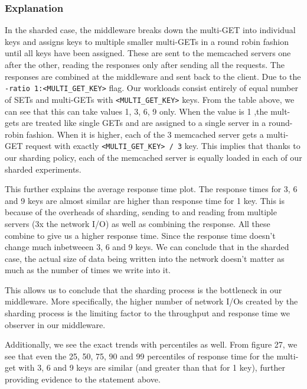 \documentclass[11pt,a4paper]{article}
\newcommand\instructions[1]{\textcolor{blue}{Instructions: #1}}
\begin{document}
\subsubsection{Explanation}

In the sharded case, the middleware breaks down the multi-GET into individual keys and assigns keys to multiple smaller multi-GETs in a round robin fashion until all keys have been assigned. These are sent to the memcached servers one after the other, reading the responses only after sending all the requests. The responses are combined at the middleware and sent back to the client. Due to the \texttt{-ratio 1:<MULTI\_GET\_KEY>} flag. Our workloads consist entirely of equal number of SETs and multi-GETs with \texttt{<MULTI\_GET\_KEY>} keys. From the table above, we can see that this can take values 1, 3, 6, 9 only. When the value is 1 ,the mult-gets are treated like single GETs and are assigned to a single server in a round-robin fashion. When it is higher, each of the 3 memcached server gets a multi-GET request with exactly \texttt{<MULTI\_GET\_KEY> / 3} key. This implies that thanks to our sharding policy, each of the memcached server is equally loaded in each of our sharded experiments.

This further explains the average response time plot. The response times for 3, 6 and 9 keys are almost similar are higher than response time for 1 key. This is because of the overheads of sharding, sending to and reading from multiple servers (3x the network I/O) as well as combining the response. All these combine to give us a higher response time. Since the response time doesn't change much inbetweeen 3, 6 and 9 keys. We can conclude that in the sharded case, the actual size of data being written into the network doesn't matter as much as the number of times we write into it.

This allows us to conclude that the sharding process is the bottleneck in our middleware. More specifically, the higher number of network I/Os created by the sharding process is the limiting factor to the throughput and response time we observer in our middleware.

Additionally, we see the exact trends with percentiles as well. From figure 27, we see that even the 25, 50, 75, 90 and 99 percentiles of response time for the multi-get with 3, 6 and 9 keys are similar (and greater than that for 1 key), further providing evidence to the statement above.
\end{document}

